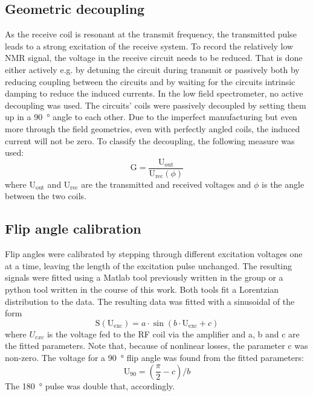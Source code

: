         \subsection{Geometric decoupling}
            As the receive coil is resonant at the transmit frequency, the transmitted pulse leads to a strong excitation of the receive system. To record the relatively low NMR signal, the voltage in the receive circuit needs to be reduced. That is done either actively e.g. by detuning the circuit during transmit or passively both by reducing coupling between the circuits and by waiting for the circuits intrinsic damping to reduce the induced currents.
            In the low field spectrometer, no active decoupling was used. The circuits' coils were passively decoupled by setting them up in a \SI{90}{\degree} angle to each other. Due to the imperfect manufacturing but even more through the field geometries, even with perfectly angled coils, the induced current will not be zero. To classify the decoupling, the following measure was used:
            \begin{equation}
            \mathrm{G}=\frac{\mathrm{U_{out}}}{\mathrm{U_{rec}}(\phi)}
            \end{equation}
            where $\mathrm{U_{out}}$ and $\mathrm{U_{rec}}$ are the transmitted and received voltages and $\phi$ is the angle between the two coils.
        \subsection{Flip angle calibration}
            Flip angles were calibrated by stepping through different excitation voltages one at a time, leaving the length of the excitation pulse unchanged. The resulting signals were fitted using a Matlab tool previously written in the group or a python tool written in the course of this work. Both tools fit a Lorentzian distribution to the data.
            The resulting data was fitted with a sinusoidal of the form
            \begin{equation}
                \mathrm{S}(\mathrm{U_{exc}})= a \cdot \sin(b\cdot \mathrm{U_{exc}} + c)
            \end{equation}
            where $U_{exc}$ is the voltage fed to the RF coil via the amplifier and a, b and c are the fitted parameters. Note that, because of nonlinear losses, the parameter c was non-zero.
            The voltage for a  \SI{90}{\degree} flip angle was found from the fitted parameters:
            \begin{equation}
                \mathrm{U}_{90} = (\frac{\pi}{2}-c)/b
            \end{equation}
            The \SI{180}{\degree} pulse was double that, accordingly.
